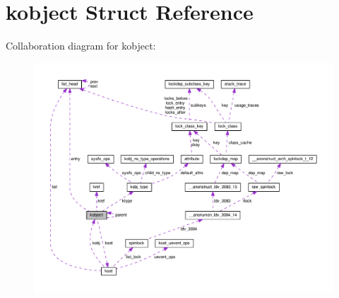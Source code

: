 \hypertarget{structkobject}{}\section{kobject Struct Reference}
\label{structkobject}


Collaboration diagram for kobject\+:
\nopagebreak
\begin{figure}[H]
\begin{center}
\leavevmode
\includegraphics[width=350pt]{structkobject__coll__graph}
\end{center}
\end{figure}
